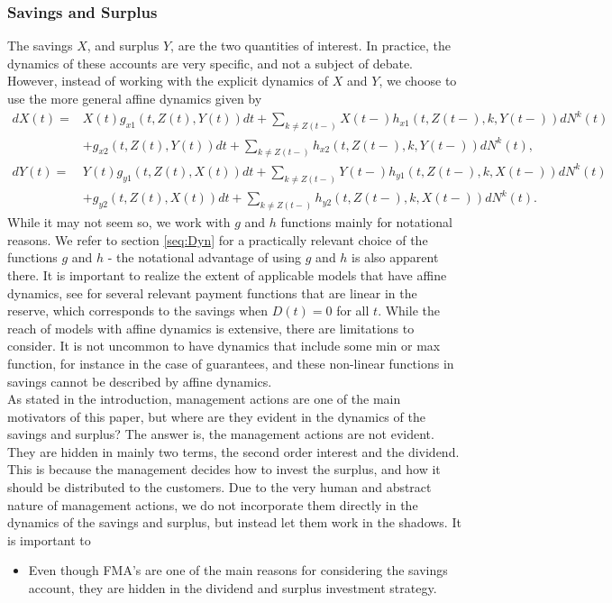\documentclass[12pt]{article}
\begin{document}
\subsubsection*{Savings and Surplus}
The savings $X$, and surplus $Y$, are the two quantities of interest. In practice, the dynamics of these accounts are very specific, and not a subject of debate. However, instead of working with the explicit dynamics of $X$ and $Y$, we choose to use the more general affine dynamics given by
\begin{align*}
dX(t)=&X(t)g_{x1}(t,Z(t),Y(t))dt + \sum_{k \neq Z(t-)} X(t-) h_{x1}(t,Z(t-),k,Y(t-)) dN^k(t)\\
&+g_{x2}(t,Z(t),Y(t))dt + \sum_{k \neq Z(t-)} h_{x2}(t,Z(t-),k,Y(t-)) dN^k(t),
\\
dY(t)=&Y(t)g_{y1}(t,Z(t),X(t))dt + \sum_{k \neq Z(t-)} Y(t-) h_{y1}(t,Z(t-),k,X(t-)) dN^k(t)
\\
&+g_{y2}(t,Z(t),X(t))dt + \sum_{k \neq Z(t-)} h_{y2}(t,Z(t-),k,X(t-)) dN^k(t).
\end{align*}
While it may not seem so, we work with $g$ and $h$ functions mainly for notational reasons. We refer to section \ref{seq:Dyn} for a practically relevant choice of the functions $g$ and $h$ - the notational advantage of using $g$ and $h$ is also apparent there. It is important to realize the extent of applicable models that have affine dynamics, see \citet{Christiansen} for several relevant payment functions that are linear in the reserve, which corresponds to the savings when $D(t)=0$ for all $t$. While the reach of models with affine dynamics is extensive, there are limitations to consider. It is not uncommon to have dynamics that include some min or max function, for instance in the case of guarantees, and these non-linear functions in savings cannot be described by affine dynamics. \\
As stated in the introduction, management actions are one of the main motivators of this paper, but where are they evident in the dynamics of the savings and surplus? The answer is, the management actions are not evident. They are hidden in mainly two terms, the second order interest and the dividend. This is because the management decides how to invest the surplus, and how it should be distributed to the customers. Due to the very human and abstract nature of management actions, we do not incorporate them directly in the dynamics of the savings and surplus, but instead let them work in the shadows. It is important to 


\begin{itemize}
\item Even though FMA's are one of the main reasons for considering the savings account, they are hidden in the dividend and surplus investment strategy.
\end{itemize}
\end{document}
